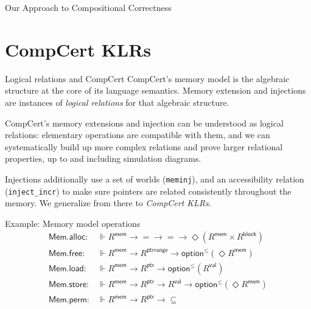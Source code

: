 \documentclass{beamer}
\newcommand{\kw}[1]{\ensuremath{ \mathsf{#1} }}
\begin{document}
\begin{frame}{Our Approach to Compositional Correctness}




\section{CompCert KLRs}

\begin{frame}{Logical relations and CompCert}
CompCert's memory model
is the algebraic structure at the core of
its language semantics.
Memory extension and injections
are instances of \emph{logical relations}
for that algebraic structure.

\vspace{1em}
CompCert's memory extensions and injection
can be understood as logical relations:
elementary operations are compatible with them,
and we can systematically build up more complex relations
and prove larger relational properties,
up to and including simulation diagrams.

\vspace{1em}
Injections additionally use a set of worlds (\texttt{meminj}),
and an accessibility relation (\texttt{inject\_incr})
to make sure pointers are related consistently throughout
the memory.
We generalize from there
to \emph{CompCert KLRs}.
\end{frame}

\begin{frame}{Example: Memory model operations}
  \begin{align*}
      \kw{Mem.alloc} :
        &\Vdash R^\kw{mem} \rightarrow {=} \rightarrow {=} \rightarrow
        \Diamond (R^\kw{mem} \times R^\kw{block})
      \\
      \kw{Mem.free} :
        &\Vdash R^\kw{mem} \rightarrow R^\kw{ptrrange} \rightarrow
        \kw{option}^\le(\Diamond R^\kw{mem})
      \\
      \kw{Mem.load} :
        &\Vdash R^\kw{mem} \rightarrow R^\kw{ptr} \rightarrow
        \kw{option}^\le(R^\kw{val})
      \\
      \kw{Mem.store} :
        &\Vdash R^\kw{mem} \rightarrow R^\kw{ptr} \rightarrow R^\kw{val} \rightarrow
        \kw{option}^\le(\Diamond R^\kw{mem})
      \\
      \kw{Mem.perm} :
        &\Vdash R^\kw{mem} \rightarrow R^\kw{ptr} \rightarrow {\subseteq}
  \end{align*}
\end{frame}


\end{frame}
\end{document}
